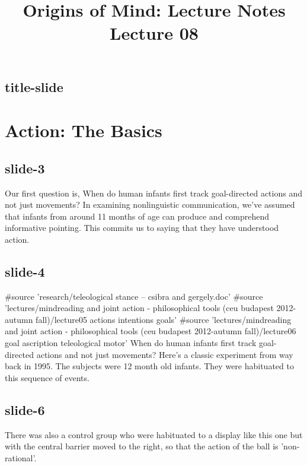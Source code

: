 \documentclass[12pt,\papersize]{extarticle}
\begin{document}
\setlength\footnotesep{1em}







\title {Origins of Mind: Lecture Notes \\ Lecture 08}
 
\maketitle
 
 
\subsection{title-slide}
 
\section{Action: The Basics}
 
 
\subsection{slide-3}
Our first question is, When do human infants first track goal-directed actions and not just movements?
In examining nonlinguistic communication, we've assumed that infants from around 11 months of age can produce and comprehend informative pointing.
This commits us to saying that they have understood action.
 
 
\subsection{slide-4}
\#source 'research/teleological stance -- csibra and gergely.doc'
\#source 'lectures/mindreading and joint action - philosophical tools (ceu budapest 2012-autumn fall)/lecture05 actions intentions goals'
\#source 'lectures/mindreading and joint action - philosophical tools (ceu budapest 2012-autumn fall)/lecture06 goal ascription teleological motor'
When do human infants first track goal-directed actions and not just movements?
Here's a classic experiment from way back in 1995.
The subjects were 12 month old infants.
They were habituated to this sequence of events.
 
 
\subsection{slide-6}
There was also a control group who were habituated to a display like this one but with the central barrier moved to the right, so that the action of the ball is 'non-rational'.
 
\end{document}
